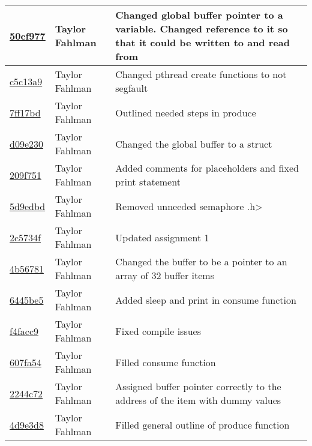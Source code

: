 \begin{tabular}{l l l}
\href{git@github.com:fahlmant/cs444/commit/50cf97754d7e3aa081ef30f56af307d2671969ff}{50cf977} & Taylor Fahlman & Changed global buffer pointer to a variable. Changed reference to it so that it could be written to and read from\\\hline
\href{git@github.com:fahlmant/cs444/commit/c5c13a973ba6f8363baf95b9e2330ea4dca16651}{c5c13a9} & Taylor Fahlman & Changed pthread create functions to not segfault\\\hline
\href{git@github.com:fahlmant/cs444/commit/7ff17bdada1706eb1057ba678bde47c8f5b18774}{7ff17bd} & Taylor Fahlman & Outlined needed steps in produce\\\hline
\href{git@github.com:fahlmant/cs444/commit/d09e23095844c4b70beb8f084938a6716eb11f24}{d09e230} & Taylor Fahlman & Changed the global buffer to a struct\\\hline
\href{git@github.com:fahlmant/cs444/commit/209f7513f40020a3ae61565dd7f115b7c72b8472}{209f751} & Taylor Fahlman & Added comments for placeholders and fixed print statement\\\hline
\href{git@github.com:fahlmant/cs444/commit/5d9edbd4229b7263d39225f1ec581258af623a3d}{5d9edbd} & Taylor Fahlman & Removed unneeded semaphore .h>\\\hline
\href{git@github.com:fahlmant/cs444/commit/2c5734f5d2cbbf0650eefb5acbf3da30c458f406}{2c5734f} & Taylor Fahlman & Updated assignment 1\\\hline
\href{git@github.com:fahlmant/cs444/commit/4b56781b7d05dd3c5653e92d8b3bfe43374a4190}{4b56781} & Taylor Fahlman & Changed the buffer to be a pointer to an array of 32 buffer items\\\hline
\href{git@github.com:fahlmant/cs444/commit/6445be50d9acb170ec3adaa80fe9418b160faf23}{6445be5} & Taylor Fahlman & Added sleep and print in consume function\\\hline
\href{git@github.com:fahlmant/cs444/commit/f4facc9d5a16eb42168ac97078b0f487a08a407c}{f4facc9} & Taylor Fahlman & Fixed compile issues\\\hline
\href{git@github.com:fahlmant/cs444/commit/607fa54aeb02833e23feaaebe3ca42504e86a20c}{607fa54} & Taylor Fahlman & Filled consume function\\\hline
\href{git@github.com:fahlmant/cs444/commit/2244c720455b015276a94f97610bd3e710e41705}{2244c72} & Taylor Fahlman & Assigned buffer pointer correctly to the address of the item with dummy values\\\hline
\href{git@github.com:fahlmant/cs444/commit/4d9e3d84c0309caf5af3ca5aed2af08010b2ef85}{4d9e3d8} & Taylor Fahlman & Filled general outline of produce function\\\hline

\end{tabular}
